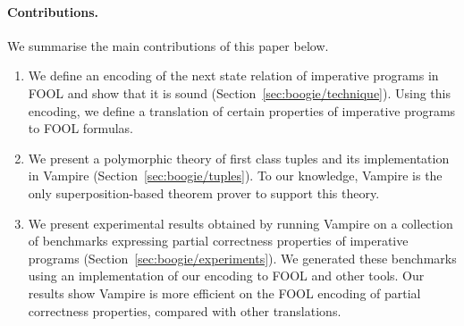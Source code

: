 \paragraph*{Contributions.} We summarise the main contributions of this paper below.
\begin{enumerate}
  \item We define an encoding of the next state relation of imperative programs in FOOL and show that it is sound (Section~\ref{sec:boogie/technique}). Using this encoding, we define a translation of certain properties of imperative programs to FOOL formulas. 
  \item We present a polymorphic theory of first class tuples and its implementation in Vampire (Section~\ref{sec:boogie/tuples}). To our knowledge, Vampire is the only superposition-based theorem prover to support this theory.
  \item We present experimental results obtained by running Vampire on a collection of benchmarks expressing partial correctness properties of imperative programs (Section~\ref{sec:boogie/experiments}). We generated these benchmarks using an implementation of our encoding to FOOL and other tools. Our results show Vampire is more efficient on the FOOL encoding of partial correctness properties, compared with other translations.
\end{enumerate}

